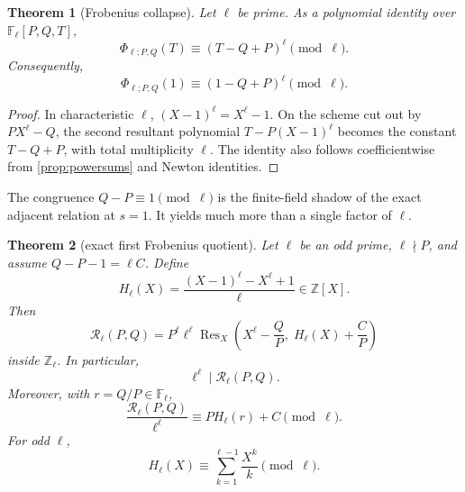 \documentclass[11pt]{article}
\newtheorem{theorem}{Theorem}[section]
\theoremstyle{definition}
\theoremstyle{remark}
\DeclareMathOperator{\Res}{Res}
\newcommand{\ZZ}{\mathbb Z}
\newcommand{\FF}{\mathbb F}
\begin{document}
\begin{theorem}[Frobenius collapse]\label{thm:frob-collapse}
Let \(\ell\) be prime.  As a polynomial identity over \(\FF_\ell[P,Q,T]\),
\begin{equation}\label{eq:frob-poly}
\Phi_{\ell;P,Q}(T)\equiv(T-Q+P)^\ell\pmod\ell.
\end{equation}
Consequently,
\[
\Phi_{\ell;P,Q}(1)\equiv(1-Q+P)^\ell\pmod\ell.
\]
\end{theorem}

\begin{proof}
In characteristic \(\ell\), \((X-1)^\ell=X^\ell-1\).  On the scheme cut out by \(PX^\ell-Q\), the second resultant polynomial
\(T-P(X-1)^\ell\) becomes the constant \(T-Q+P\), with total multiplicity \(\ell\).  The identity also follows coefficientwise from \cref{prop:powersums} and Newton identities.
\end{proof}

The congruence \(Q-P\equiv1\pmod\ell\) is the finite-field shadow of the exact adjacent relation at \(s=1\).  It yields much more than a single factor of \(\ell\).

\begin{theorem}[exact first Frobenius quotient]\label{thm:first-quotient}
Let \(\ell\) be an odd prime, \(\ell\nmid P\), and assume
\(Q-P-1=\ell C\).  Define
\begin{equation}\label{eq:Hpoly}
H_\ell(X)=\frac{(X-1)^\ell-X^\ell+1}{\ell}\in\ZZ[X].
\end{equation}
Then
\begin{equation}\label{eq:frob-factorization}
\mathscr R_\ell(P,Q)
=P^\ell\ell^\ell
\Res_X\!\left(
X^\ell-\frac QP,\;
H_\ell(X)+\frac CP
\right)
\end{equation}
inside \(\ZZ_\ell\).  In particular,
\begin{equation}\label{eq:ell-ell-div}
\ell^\ell\mid\mathscr R_\ell(P,Q).
\end{equation}
Moreover, with \(r=Q/P\in\FF_\ell\),
\begin{equation}\label{eq:first-residue}
\frac{\mathscr R_\ell(P,Q)}{\ell^\ell}
\equiv P H_\ell(r)+C\pmod\ell.
\end{equation}
For odd \(\ell\),
\begin{equation}\label{eq:finite-log}
H_\ell(X)\equiv\sum_{k=1}^{\ell-1}\frac{X^k}{k}\pmod\ell.
\end{equation}
\end{theorem}
\end{document}
